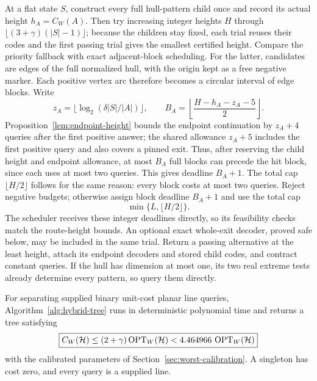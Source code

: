 At a flat state $S$, construct every full hull-pattern child once and
record its actual height $h_A=C_W(A)$. Then try increasing integer
heights $H$ through $\lfloor(3+\gamma)(|S|-1)\rfloor$; because the
children stay fixed, each trial reuses their codes and the first passing
trial gives the smallest certified height. Compare the priority
fallback with exact adjacent-block scheduling. For the latter,
candidates are edges of the full normalized hull, with the origin kept
as a free negative marker. Each positive vertex arc therefore becomes
a circular interval of edge blocks.
Write
\[
 z_A=\lfloor\log_2(\delta |S|/|A|)\rfloor,\qquad
 B_A=\left\lfloor\frac{H-h_A-z_A-5}{2}\right\rfloor.
\]
Proposition~\ref{lem:endpoint-height} bounds the endpoint continuation
by $z_A+4$ queries after the first positive answer; the shared allowance
$z_A+5$ includes the first positive query and also covers a pinned exit.
Thus, after reserving the child height and endpoint allowance, at most
$B_A$ full blocks can precede the hit block, since each uses at most two
queries. This gives deadline $B_A+1$. The total cap
$\lfloor H/2\rfloor$ follows for the same reason: every block costs at
most two queries.
Reject negative budgets; otherwise assign block deadline $B_A+1$ and
use the total cap
\begin{equation}\label{eq:hybrid-total-cap}
 \min\{L,\lfloor H/2\rfloor\}.
\end{equation}
The scheduler receives these integer deadlines directly, so its
feasibility checks match the route-height bounds. An optional exact
whole-exit decoder, proved safe below, may be included in the same
trial. Return a passing alternative at the least height, attach its
endpoint decoders and stored child codes, and contract constant
queries. If the hull has dimension at most one, its two real extreme
tests already determine every pattern, so query them directly.




\begin{theorem}
\label{thm:poly-slot-worst}
For separating supplied binary unit-cost planar line queries,
Algorithm~\ref{alg:hybrid-tree} runs in deterministic polynomial time
and returns a tree satisfying
\[
 \boxed{C_W(\mathcal H)\le(2+\gamma)\operatorname{OPT}_W(\mathcal H)<4.464966\,\operatorname{OPT}_W(\mathcal H)}
\]
with the calibrated parameters of Section~\ref{sec:worst-calibration}.
A singleton has cost zero, and every query is a supplied line.
\end{theorem}

